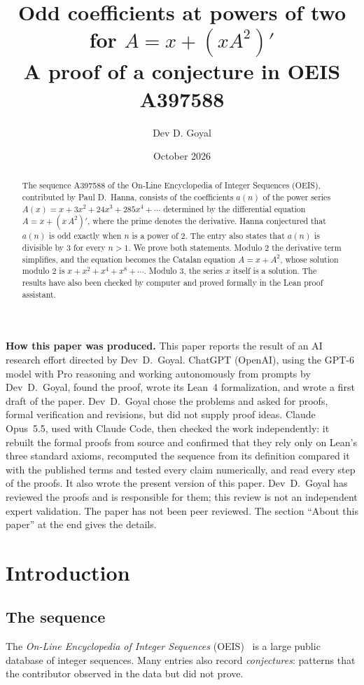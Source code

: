 \documentclass[11pt,a4paper]{article}
\title{Odd coefficients at powers of two for $A=x+(xA^2)'$\\[6pt]\large A proof of a conjecture in OEIS A397588}
\author{Dev D. Goyal}
\date{October 2026}
\theoremstyle{definition}
\theoremstyle{remark}
\begin{document}
\maketitle
\begin{abstract}
The sequence A397588 of the On-Line Encyclopedia of Integer Sequences (OEIS), contributed by Paul D.~Hanna, consists of
the coefficients $a(n)$ of the power series $A(x)=x+3x^2+24x^3+285x^4+\cdots$ determined by the differential equation
$A=x+(x\,A^2)'$, where the prime denotes the derivative. Hanna conjectured that $a(n)$ is odd exactly when $n$ is a power
of $2$. The entry also states that $a(n)$ is divisible by $3$ for every $n>1$. We prove both statements. Modulo $2$ the
derivative term simplifies, and the equation becomes the Catalan equation $A=x+A^2$, whose solution modulo $2$ is
$x+x^2+x^4+x^8+\cdots$. Modulo $3$, the series $x$ itself is a solution. The results have also been checked by computer
and proved formally in the Lean proof assistant.
\end{abstract}
\begin{center}\begin{minipage}{0.88\linewidth}\small
\textbf{How this paper was produced.} This paper reports the result of an AI research effort directed by
Dev~D.~Goyal. ChatGPT (OpenAI), using the GPT-6 model with Pro reasoning and working autonomously from prompts by
Dev~D.~Goyal, found the proof, wrote its Lean~4 formalization, and wrote a first draft of the paper.
Dev~D.~Goyal chose the problems and asked for proofs, formal verification and revisions, but did not supply proof
ideas. Claude Opus~5.5, used with Claude Code, then checked the work independently: it rebuilt the formal proofs from
source and confirmed that they rely only on Lean's three standard axioms, recomputed the sequence from its definition
compared it with the published terms and tested every claim numerically, and read every step of the proofs. It also wrote the present
version of this paper.
Dev~D.~Goyal has reviewed the proofs and is responsible for them; this review is not an independent expert validation.
The paper has not been peer reviewed.
The section ``About this paper'' at the end gives the details.
\end{minipage}\end{center}

\section{Introduction}

\subsection{The sequence}\label{sec:sequence}
The \emph{On-Line Encyclopedia of Integer Sequences} (OEIS)~\cite{oeisdb} is a large public database of integer
sequences. Many
entries also record \emph{conjectures}: patterns that the contributor observed in the data but did not prove.
\end{document}
